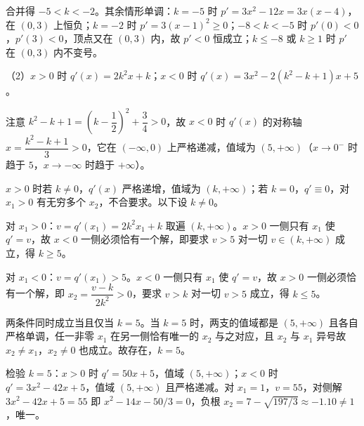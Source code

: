 \begin{answer}
合并得 $-5<k<-2$。其余情形单调：$k=-5$ 时 $p'=3x^2-12x=3x(x-4)$，在 $(0,3)$ 上恒负；$k=-2$ 时 $p'=3(x-1)^2\geqslant0$；$-8<k<-5$ 时 $p'(0)<0$，$p'(3)<0$，顶点又在 $(0,3)$ 内，故 $p'<0$ 恒成立；$k\leqslant-8$ 或 $k\geqslant1$ 时 $p'$ 在 $(0,3)$ 内不变号。

（2）$x>0$ 时 $q'(x)=2k^2x+k$；$x<0$ 时 $q'(x)=3x^2-2(k^2-k+1)x+5$。

注意 $k^2-k+1=\left(k-\dfrac12\right)^2+\dfrac34>0$，故 $x<0$ 时 $q'(x)$ 的对称轴 $x=\dfrac{k^2-k+1}{3}>0$，它在 $(-\infty,0)$ 上严格递减，值域为 $(5,+\infty)$（$x\to0^-$ 时趋于 $5$，$x\to-\infty$ 时趋于 $+\infty$）。

$x>0$ 时若 $k\neq0$，$q'(x)$ 严格递增，值域为 $(k,+\infty)$；若 $k=0$，$q'\equiv0$，对 $x_1>0$ 有无穷多个 $x_2$，不合要求。以下设 $k\neq0$。

对 $x_1>0$：$v=q'(x_1)=2k^2x_1+k$ 取遍 $(k,+\infty)$。$x>0$ 一侧只有 $x_1$ 使 $q'=v$，故 $x<0$ 一侧必须恰有一个解，即要求 $v>5$ 对一切 $v\in(k,+\infty)$ 成立，得 $k\geqslant5$。

对 $x_1<0$：$v=q'(x_1)>5$。$x<0$ 一侧只有 $x_1$ 使 $q'=v$，故 $x>0$ 一侧必须恰有一个解，即 $x_2=\dfrac{v-k}{2k^2}>0$，要求 $v>k$ 对一切 $v>5$ 成立，得 $k\leqslant5$。

两条件同时成立当且仅当 $k=5$。当 $k=5$ 时，两支的值域都是 $(5,+\infty)$ 且各自严格单调，任一非零 $x_1$ 在另一侧恰有唯一的 $x_2$ 与之对应，且 $x_2$ 与 $x_1$ 异号故 $x_2\neq x_1$，$x_2\neq0$ 也成立。故存在，$k=5$。

检验 $k=5$：$x>0$ 时 $q'=50x+5$，值域 $(5,+\infty)$；$x<0$ 时 $q'=3x^2-42x+5$，值域 $(5,+\infty)$ 且严格递减。对 $x_1=1$，$v=55$，对侧解 $3x^2-42x+5=55$ 即 $x^2-14x-50/3=0$，负根 $x_2=7-\sqrt{197/3}\approx-1.10\neq1$，唯一。


\end{answer}